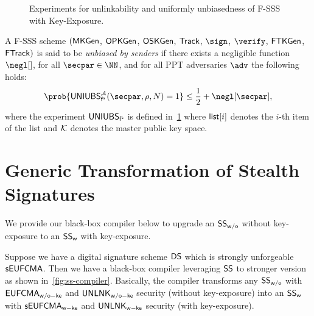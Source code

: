 \begin{figure}[!t]
\begin{pcvstack}[boxed]
\begin{pchstack}
    \end{pchstack}
    \end{pcvstack}
    \caption{\small Experiments for unlinkability and uniformly unbiasedness of F-SSS with Key-Exposure.}
    \label{fig:experiment_unlink_with_key_exposure_fuzzy*}
    \label{fig:experiment_unbias}
\end{figure}


\begin{definition}\label{def:fuzzy*-tracking-unbias}
A F-SSS scheme $(\mathsf{MKGen}$, $\mathsf{OPKGen}$, $\mathsf{OSKGen}$, $\mathsf{Track}$, $\sign$, $\verify$, $\mathsf{FTKGen}$, $\mathsf{FTrack})$ is said to be \emph{unbiased by senders} if there exists a negligible function $\negl[]$, for all $\secpar \in \NN$, and for all PPT adversaries $\adv$ the following holds:
$$\prob{\uniubs^\Ac(\secpar,\rho,N)=1}\le \frac{1}{2}+\negl[\secpar],
$$
where the experiment $\mathsf{UNIUBS}_\mathsf{f^s}$ is defined in~\cref{fig:experiment_unbias} where $\mathsf{list}[i]$ denotes the $i$-th item of the list and $\mathcal{K}$ denotes the master public key space.

\end{definition}

\section{Generic Transformation of Stealth Signatures}
\label{sec:compiler}
We provide our black-box compiler below to upgrade an $\mathsf{SS}_\mathsf{w/o}$ without key-exposure to an $\mathsf{SS}_{\mathsf{w}}$ with key-exposure.

Suppose we have a digital signature scheme $\mathsf{DS}$ which is strongly unforgeable $\mathsf{sEUFCMA}$. Then we have a black-box compiler leveraging $\mathsf{SS}$ to stronger version as shown in~\cref{fig:ss-compiler}. Basically, the compiler transforms any $\mathsf{SS}_\mathsf{w/o}$ with $\mathsf{EUFCMA}_\mathsf{w/o-ke}$ and $\mathsf{UNLNK}_\mathsf{w/o-ke}$ security (without key-exposure) into an $\mathsf{SS}_{\mathsf{w}}$ with $\mathsf{sEUFCMA}_\mathsf{w-ke}$ and $\mathsf{UNLNK}_\mathsf{w-ke}$ security (with key-exposure).

